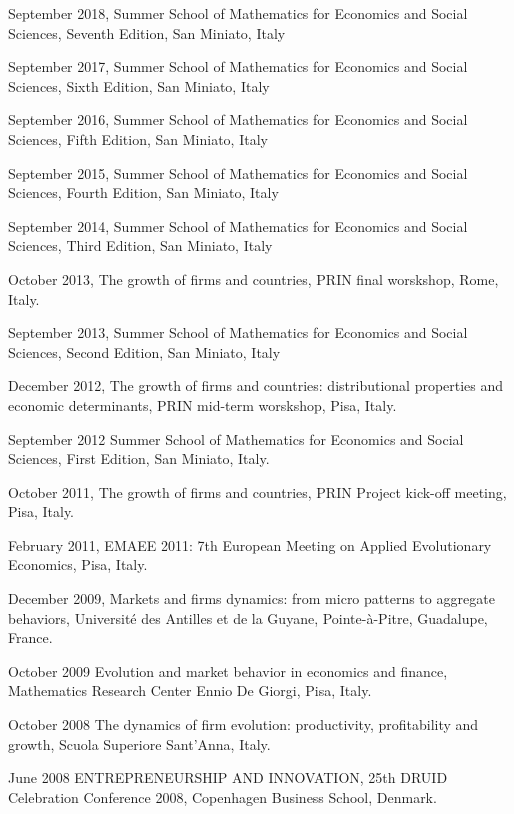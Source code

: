 \documentclass[a4paper]{article}
\begin{document}
September 2018, Summer School of Mathematics for Economics and Social
Sciences, Seventh Edition, San Miniato, Italy

September 2017, Summer School of Mathematics for Economics and Social
Sciences, Sixth Edition, San Miniato, Italy

September 2016, Summer School of Mathematics for Economics and Social
Sciences, Fifth Edition, San Miniato, Italy

September 2015, Summer School of Mathematics for Economics and Social
Sciences, Fourth Edition, San Miniato, Italy

September 2014, Summer School of Mathematics for Economics and Social
Sciences, Third Edition, San Miniato, Italy

October 2013, \textquotedbl{}The growth of firms and countries\textquotedbl{}, PRIN final
worskshop, Rome, Italy.

September 2013, Summer School of Mathematics for Economics and Social
Sciences, Second Edition, San Miniato, Italy

December 2012, \textquotedbl{}The growth of firms and countries: distributional
properties and economic determinants\textquotedbl{}, PRIN mid-term worskshop, Pisa,
Italy.

September 2012 \textquotedbl{}Summer School of Mathematics for Economics and Social
Sciences\textquotedbl{}, First Edition, San Miniato, Italy.

October 2011, \textquotedbl{}The growth of firms and countries\textquotedbl{}, PRIN Project
kick-off meeting, Pisa, Italy.

February 2011, \textquotedbl{}EMAEE 2011: 7th European Meeting on Applied
Evolutionary Economics\textquotedbl{}, Pisa, Italy.

December 2009, \textquotedbl{}Markets and firms dynamics: from micro patterns to
aggregate behaviors\textquotedbl{}, Université des Antilles et de la Guyane,
Pointe-à-Pitre, Guadalupe, France.

October 2009 \textquotedbl{}Evolution and market behavior in economics and finance\textquotedbl{},
Mathematics Research Center \textquotedbl{}Ennio De Giorgi\textquotedbl{}, Pisa, Italy.

October 2008 \textquotedbl{}The dynamics of firm evolution: productivity,
profitability and growth\textquotedbl{}, Scuola Superiore Sant'Anna, Italy.

June 2008 \textquotedbl{}ENTREPRENEURSHIP AND INNOVATION\textquotedbl{}, 25th DRUID Celebration
Conference 2008, Copenhagen Business School, Denmark.
\end{document}
